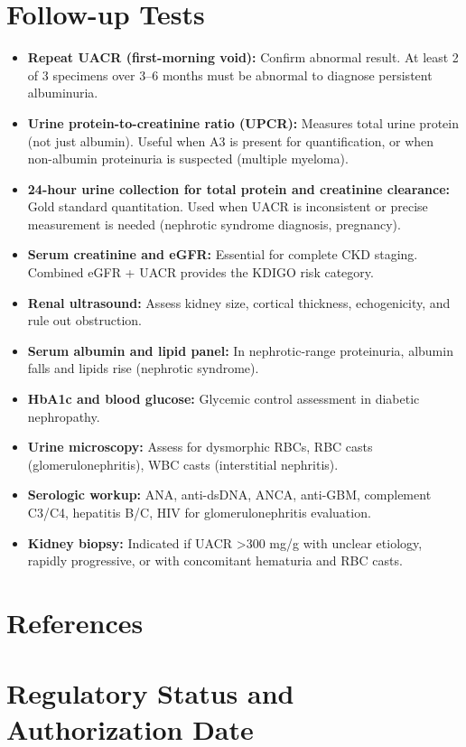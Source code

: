 \section*{Follow-up Tests}
\begin{itemize}
  \item \textbf{Repeat UACR (first-morning void):} Confirm abnormal result. At least 2 of 3 specimens over 3--6 months must be abnormal to diagnose persistent albuminuria.
  \item \textbf{Urine protein-to-creatinine ratio (UPCR):} Measures total urine protein (not just albumin). Useful when A3 is present for quantification, or when non-albumin proteinuria is suspected (multiple myeloma).
  \item \textbf{24-hour urine collection for total protein and creatinine clearance:} Gold standard quantitation. Used when UACR is inconsistent or precise measurement is needed (nephrotic syndrome diagnosis, pregnancy).
  \item \textbf{Serum creatinine and eGFR:} Essential for complete CKD staging. Combined eGFR + UACR provides the KDIGO risk category.
  \item \textbf{Renal ultrasound:} Assess kidney size, cortical thickness, echogenicity, and rule out obstruction.
  \item \textbf{Serum albumin and lipid panel:} In nephrotic-range proteinuria, albumin falls and lipids rise (nephrotic syndrome).
  \item \textbf{HbA1c and blood glucose:} Glycemic control assessment in diabetic nephropathy.
  \item \textbf{Urine microscopy:} Assess for dysmorphic RBCs, RBC casts (glomerulonephritis), WBC casts (interstitial nephritis).
  \item \textbf{Serologic workup:} ANA, anti-dsDNA, ANCA, anti-GBM, complement C3/C4, hepatitis B/C, HIV for glomerulonephritis evaluation.
  \item \textbf{Kidney biopsy:} Indicated if UACR >300 mg/g with unclear etiology, rapidly progressive, or with concomitant hematuria and RBC casts.
\end{itemize}

\section*{References}



\clearpage
\section*{Regulatory Status and Authorization Date}

\clearpage
